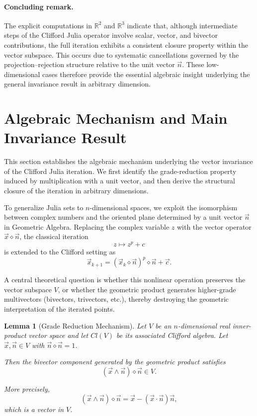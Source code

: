 \documentclass{amsart}
\theoremstyle{plain}
\newtheorem{lemma}{Lemma}
\numberwithin{equation}{section}
\begin{document}
\paragraph{Concluding remark.}
The explicit computations in $\mathbb{R}^2$ and $\mathbb{R}^3$ indicate that, although intermediate steps of the Clifford Julia operator involve scalar, vector, and bivector contributions, the full iteration exhibits a consistent closure property within the vector subspace. This occurs due to systematic cancellations governed by the projection–rejection structure relative to the unit vector $\vec n$. These low-dimensional cases therefore provide the essential algebraic insight underlying the general invariance result in arbitrary dimension.

\section{Algebraic Mechanism and Main Invariance Result}

This section establishes the algebraic mechanism underlying the vector invariance of the Clifford Julia iteration. We first identify the grade-reduction property induced by multiplication with a unit vector, and then derive the structural closure of the iteration in arbitrary dimensions.

To generalize Julia sets to $n$-dimensional spaces, we exploit the isomorphism between complex numbers and the oriented plane determined by a unit vector $\vec{n}$ in Geometric Algebra. Replacing the complex variable $z$ with the vector operator $\vec{x} \diamond \vec{n}$, the classical iteration
\[
z \mapsto z^p + c
\]
is extended to the Clifford setting as
\[
\vec{x}_{k+1} = (\vec{x}_k \diamond \vec{n})^p \diamond \vec{n} + \vec{c}.
\]

A central theoretical question is whether this nonlinear operation preserves the vector subspace $V$, or whether the geometric product generates higher-grade multivectors (bivectors, trivectors, etc.), thereby destroying the geometric interpretation of the iterated points.


\begin{lemma}[Grade Reduction Mechanism]
Let $V$ be an $n$-dimensional real inner-product vector space and let $Cl(V)$ be its associated Clifford algebra. Let $\vec x,\vec n \in V$ with $\vec n \diamond \vec n = 1$.

Then the bivector component generated by the geometric product satisfies
\[
(\vec x \wedge \vec n)\diamond \vec n \in V.
\]

More precisely,
\[
(\vec x \wedge \vec n)\diamond \vec n
=
\vec x - (\vec x \cdot \vec n)\vec n,
\]
which is a vector in $V$.
\end{lemma}
\end{document}
